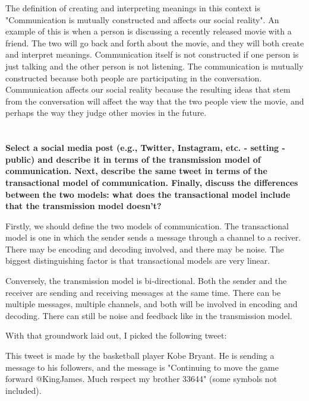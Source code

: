 \documentclass[a4paper]{article}
\begin{document}
        The definition of creating and interpreting meanings in this context is "Communication is mutually constructed and affects our 
        social reality". An example of this is when a person is discussing a recently released movie with a friend. The two will 
        go back and forth about the movie, and they will both create and interpret meanings. Communication itself is not 
        constructed if one person is just talking and the other person is not listening. The communication is mutually constructed
        because both people are participating in the conversation. Communication affects our social reality because the
        resulting ideas that stem from the conversation will affect the way that the two people view the movie, and 
        perhaps the way they judge other movies in the future.

  
    \section{}
        \textbf{Select a social media post (e.g., Twitter, Instagram, etc. - setting - public) and describe it in terms of the transmission model of communication. Next, describe the same tweet in terms of the transactional model of communication. Finally, discuss the differences between the two models: what does the transactional model include that the transmission model doesn’t?}

        Firstly, we should define the two models of communication. The transactional model is one in which the sender sends a message
        through a channel to a reciver. There may be encoding and decoding involved, and there may be noise. The biggest 
        distinguishing factor is that transactional models are very linear. 

        Conversely, the transmission model is bi-directional. Both the sender and the receiver are sending and receiving messages
        at the same time. There can be multiple messages, multiple channels, and both will be involved in encoding and decoding.
        There can still be noise and feedback like in the transmission model. 

        With that groundwork laid out, I picked the following tweet: \cite{kobeTweet}

        This tweet is made by the basketball player Kobe Bryant. He is sending a message to his followers, and the message is
        "Continuing to move the game forward @KingJames. Much respect my brother 33644" (some symbols not included). 
        
\end{document}
